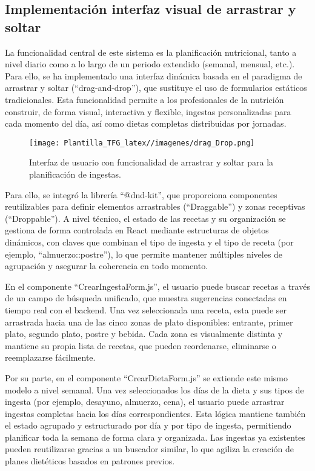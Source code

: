 \subsection*{Implementación interfaz visual de arrastrar y soltar}
La funcionalidad central de este sistema es la planificación nutricional, tanto a nivel diario como a lo largo de un periodo extendido (semanal, mensual, etc.). Para ello, se ha implementado una interfaz dinámica basada en el paradigma de arrastrar y soltar (``drag-and-drop''), que sustituye el uso de formularios estáticos tradicionales. Esta funcionalidad permite a los profesionales de la nutrición construir, de forma visual, interactiva y flexible, ingestas personalizadas para cada momento del día, así como dietas completas distribuidas por jornadas.

\begin{figure}[H]
    \centering
    \texttt{[image: Plantilla\_TFG\_latex//imagenes/drag\_Drop.png]}
    \caption{Interfaz de usuario con funcionalidad de arrastrar y soltar para la planificación de ingestas.}
    \label{fig:enter-label}
\end{figure}

Para ello, se integró la librería ``@dnd-kit'', que proporciona componentes reutilizables para definir elementos arrastrables (``Draggable'') y zonas receptivas (``Droppable''). A nivel técnico, el estado de las recetas y su organización se gestiona de forma controlada en React mediante estructuras de objetos dinámicos, con claves que combinan el tipo de ingesta y el tipo de receta (por ejemplo, ``almuerzo::postre''), lo que permite mantener múltiples niveles de agrupación y asegurar la coherencia en todo momento.

En el componente ``CrearIngestaForm.js'', el usuario puede buscar recetas a través de un campo de búsqueda unificado, que muestra sugerencias conectadas en tiempo real con el backend. Una vez seleccionada una receta, esta puede ser arrastrada hacia una de las cinco zonas de plato disponibles: entrante, primer plato, segundo plato, postre y bebida. Cada zona es visualmente distinta y mantiene su propia lista de recetas, que pueden reordenarse, eliminarse o reemplazarse fácilmente.

Por su parte, en el componente ``CrearDietaForm.js'' se extiende este mismo modelo a nivel semanal. Una vez seleccionados los días de la dieta y sus tipos de ingesta (por ejemplo, desayuno, almuerzo, cena), el usuario puede arrastrar ingestas completas hacia los días correspondientes. Esta lógica mantiene también el estado agrupado y estructurado por día y por tipo de ingesta, permitiendo planificar toda la semana de forma clara y organizada. Las ingestas ya existentes pueden reutilizarse gracias a un buscador similar, lo que agiliza la creación de planes dietéticos basados en patrones previos.

